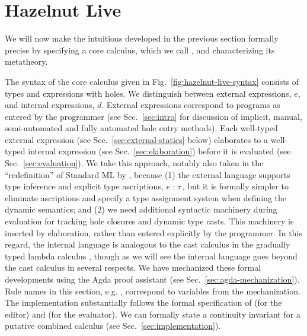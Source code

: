 \newcommand{\calculusSec}{Hazelnut Live}
\section{\calculusSec}
\label{sec:calculus}





We will now make the intuitions developed in the previous section formally
precise by specifying a core calculus, which we call \HazelnutLive, and
characterizing its metatheory.

\noindent
{} The syntax of the core calculus given in
Fig.~\ref{fig:hazelnut-live-syntax} consists of types and expressions with
holes.  We distinguish between {external} expressions, $e$, and {internal}
expressions, $d$.  External expressions correspond to programs as entered
by the programmer (see Sec.~\ref{sec:intro} for discussion of implicit,
manual, semi-automated and fully automated hole entry methods).  Each
well-typed external expression (see Sec.~\ref{sec:external-statics} below)
elaborates to a well-typed internal expression (see
Sec.~\ref{sec:elaboration}) before it is evaluated (see
Sec.~\ref{sec:evaluation}).  We take this approach, notably also taken in
the ``redefinition'' of Standard ML by \citet{Harper00atype-theoretic},
because (1) the external language supports type inference and explicit type
ascriptions, $e : \tau$, but it is formally simpler to eliminate
ascriptions and specify a type assignment system when defining the dynamic
semantics; and (2) we need additional syntactic machinery during evaluation
for tracking hole closures and dynamic type casts.  This machinery is
inserted by elaboration, rather than entered explicitly by the programmer.
In this regard, the internal language is analogous to the cast calculus in
the gradually typed lambda calculus
\cite{DBLP:conf/snapl/SiekVCB15,Siek06a}, though as we will see the
\HazelnutLive internal language goes beyond the cast calculus in several
respects. We have mechanized these formal developments using the Agda proof
assistant \cite{norell:thesis,norell2009dependently} (see
Sec.~\ref{sec:agda-mechanization}). Rule names in this section,
e.g. , correspond to variables from the
mechanization. The \Hazel implementation substantially follows the formal
specification of \Hazelnut (for the editor) and \HazelnutLive
(for the evaluator). We can formally state a continuity invariant for a
putative combined calculus (see Sec.~\ref{sec:implementation}).

